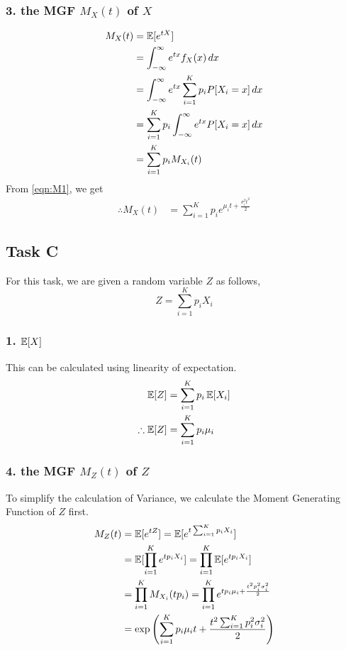 \subsubsection*{3. \normalfont the MGF $M_X(t)$ of $X$}
\begin{align*}
	M_X(t) & = \operatorname{\mathbb{E}}[e^{tX}]                                                    \\
	       & = \int_{-\infty}^{\infty} e^{tx} f_X(x) \, dx                    \\
	       & = \int_{-\infty}^{\infty} e^{tx} \sum_{i=1}^K p_i P[X_i=x] \, dx \\
	       & = \sum_{i=1}^K p_i \int_{-\infty}^{\infty} e^{tx} P[X_i=x] \, dx \\
	       & = \sum_{i=1}^K p_i M_{X_i}(t)
\end{align*}
From \cref{eqn:M1}, we get
\begin{align}
	\therefore M_X(t) & = \sum_{i=1}^K p_i e^{\mu_i t + \frac{\sigma_i^2 t^2}{2}} \label{eqn:M2}
\end{align}

\subsection*{Task C}
For this task, we are given a random variable $Z$ as follows,
\[Z = \sum_{i=1}^K p_i X_i\]

\subsubsection*{1. $\operatorname{\mathbb{E}}[X]$}
This can be calculated using linearity of expectation.
\begin{align}
	\operatorname{\mathbb{E}}[Z]            & = \sum_{i=1}^K p_i \operatorname{\mathbb{E}}[X_i] \nonumber  \\
	\therefore \operatorname{\mathbb{E}}[Z] & = \sum_{i=1}^K p_i \mu_i \label{eq:E4}
\end{align}

\subsubsection*{4. \normalfont the MGF $M_Z(t)$ of $Z$}
To simplify the calculation of Variance, we calculate the Moment Generating Function of $Z$ first.
\begin{align}
	M_Z(t) & = \operatorname{\mathbb{E}}[e^{tZ}] \nonumber
	= \operatorname{\mathbb{E}}[e^{t\sum_{i=1}^K p_i X_i}] \nonumber                                                                          \\
	       & = \operatorname{\mathbb{E}}[\prod_{i=1}^K e^{tp_i X_i}] \nonumber
	= \prod_{i=1}^K \operatorname{\mathbb{E}}[e^{tp_i X_i}] \nonumber                                                                         \\
	       & = \prod_{i=1}^K M_{X_i}(tp_i) \nonumber
	= \prod_{i=1}^K e^{tp_i \mu_i + \frac{t^2 p_i^2 \sigma_i^2}{2}}\nonumber                                            \\
	       & = \exp\left({\sum_{i=1}^K p_i \mu_i t + \frac{t^2 \sum_{i=1}^K p_i^2 \sigma_i^2}{2}} \right)\label{eqn:M3}
\end{align}

